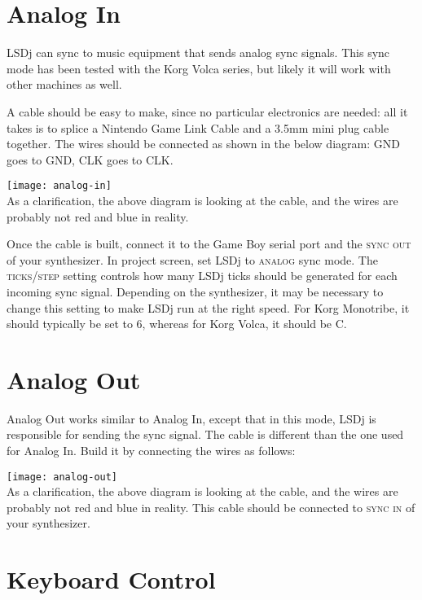 \section{Analog In}

LSDj can sync to music equipment that sends analog sync signals. This sync mode has been tested with the Korg Volca series, but likely it will work with other machines as well.

A cable should be easy to make, since no particular electronics are needed: all it takes is to splice a Nintendo Game Link Cable and a 3.5mm mini plug cable together. The wires should be connected as shown in the below diagram: GND goes to GND, CLK goes to CLK.

\texttt{[image: analog-in]}\\

As a clarification, the above diagram is looking at the cable, and the wires are probably not red and blue in reality.

Once the cable is built, connect it to the Game Boy serial port and the \textsc{sync out} of your synthesizer. In project screen, set LSDj to \textsc{analog} sync mode. The \textsc{ticks/step} setting controls how many LSDj ticks should be generated for each incoming sync signal. Depending on the synthesizer, it may be necessary to change this setting to make LSDj run at the right speed. For Korg Monotribe, it should typically be set to 6, whereas for Korg Volca, it should be C.

\section{Analog Out}

Analog Out works similar to Analog In, except that in this mode, LSDj is responsible for sending the sync signal. The cable is different than the one used for Analog In. Build it by connecting the wires as follows:

\texttt{[image: analog-out]}\\

As a clarification, the above diagram is looking at the cable, and the wires are probably not red and blue in reality. This cable should be connected to \textsc{sync in} of your synthesizer.

\section{Keyboard Control}

